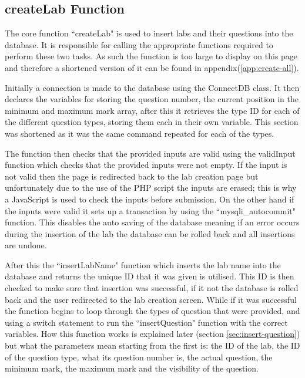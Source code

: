 \documentclass[11pt]{report}
\begin{document}
\subsection*{createLab Function}

The core function ``createLab" is used to insert labs and their questions into the database. It is responsible for calling the appropriate functions required to perform these two tasks. As such the function is too large to display on this page and therefore a shortened version of it can be found in appendix(\ref{app:create-all}). 

Initially a connection is made to the database using the ConnectDB class. It then declares the variables for storing the question number, the current position in the minimum and maximum mark array, after this it retrieves the type ID for each of the different question types, storing them each in their own variable. This section was shortened as it was the same command repeated for each of the types.

The function then checks that the provided inputs are valid using the validInput function which checks that the provided inputs were not empty. If the input is not valid then the page is redirected back to the lab creation page but unfortunately due to the use of the PHP script the inputs are erased; this is why a JavaScript is used to check the inputs before submission. On the other hand if the inputs were valid it sets up a transaction by using the ``mysqli\_autocommit" function. This disables the auto saving of the database meaning if an error occurs during the insertion of the lab the database can be rolled back and all insertions are undone.




After this the ``insertLabName" function which inserts the lab name into the database and returns the unique ID that it was given is utilised. This ID is then checked to make sure that insertion was successful, if it not the database is rolled back and the user redirected to the lab creation screen. While if it was successful the function begins to loop through the types of question that were provided, and using a switch statement to run the ``insertQuestion" function with the correct variables. How this function works is explained later (section \ref{sec:insert-question}) but what the parameters mean starting from the first is: the ID of the lab, the ID of the question type, what its question number is, the actual question, the minimum mark, the maximum mark and the visibility of the question.
\end{document}
